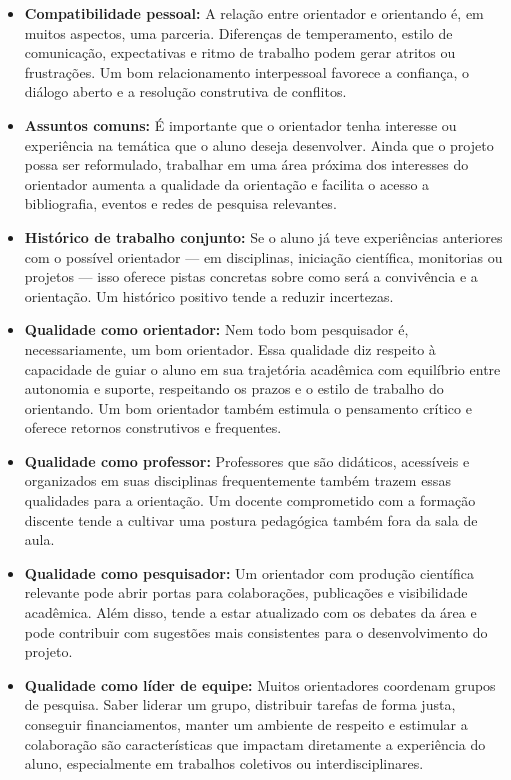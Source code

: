 \begin{itemize}
\item \textbf{Compatibilidade pessoal:} A relação entre orientador e orientando é, em muitos aspectos, uma parceria. Diferenças de temperamento, estilo de comunicação, expectativas e ritmo de trabalho podem gerar atritos ou frustrações. Um bom relacionamento interpessoal favorece a confiança, o diálogo aberto e a resolução construtiva de conflitos.

\item \textbf{Assuntos comuns:} É importante que o orientador tenha interesse ou experiência na temática que o aluno deseja desenvolver. Ainda que o projeto possa ser reformulado, trabalhar em uma área próxima dos interesses do orientador aumenta a qualidade da orientação e facilita o acesso a bibliografia, eventos e redes de pesquisa relevantes.

\item \textbf{Histórico de trabalho conjunto:} Se o aluno já teve experiências anteriores com o possível orientador — em disciplinas, iniciação científica, monitorias ou projetos — isso oferece pistas concretas sobre como será a convivência e a orientação. Um histórico positivo tende a reduzir incertezas.

\item \textbf{Qualidade como orientador:} Nem todo bom pesquisador é, necessariamente, um bom orientador. Essa qualidade diz respeito à capacidade de guiar o aluno em sua trajetória acadêmica com equilíbrio entre autonomia e suporte, respeitando os prazos e o estilo de trabalho do orientando. Um bom orientador também estimula o pensamento crítico e oferece retornos construtivos e frequentes.

\item \textbf{Qualidade como professor:} Professores que são didáticos, acessíveis e organizados em suas disciplinas frequentemente também trazem essas qualidades para a orientação. Um docente comprometido com a formação discente tende a cultivar uma postura pedagógica também fora da sala de aula.

\item \textbf{Qualidade como pesquisador:} Um orientador com produção científica relevante pode abrir portas para colaborações, publicações e visibilidade acadêmica. Além disso, tende a estar atualizado com os debates da área e pode contribuir com sugestões mais consistentes para o desenvolvimento do projeto.

\item \textbf{Qualidade como líder de equipe:} Muitos orientadores coordenam grupos de pesquisa. Saber liderar um grupo, distribuir tarefas de forma justa, conseguir financiamentos, manter um ambiente de respeito e estimular a colaboração são características que impactam diretamente a experiência do aluno, especialmente em trabalhos coletivos ou interdisciplinares.


\end{itemize}
